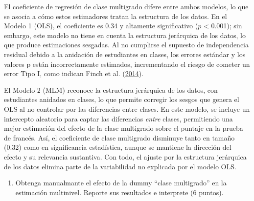 \documentclass[
  12pt,
  a4paper,
]{article}
\providecommand{\tightlist}{%
  \setlength{\itemsep}{0pt}\setlength{\parskip}{0pt}}
\begin{document}
El coeficiente de regresión de clase multigrado difere entre ambos modelos, lo que se asocia a cómo estos estimadores tratan la estructura de los datos. En el Modelo 1 (OLS), el coeficiente es 0.34 y altamente significativo (\(p\) \textless{} 0.001); sin embargo, este modelo no tiene en cuenta la estructura jerárquica de los datos, lo que produce estimaciones sesgadas. Al no cumplirse el supuesto de independencia residual debido a la anidación de estudiantes en clases, los errores estándar y los valores p están incorrectamente estimados, incrementando el riesgo de cometer un error Tipo I, como indican Finch et al. (\protect\hyperlink{ref-finch_multilevel_2014}{2014}).

El Modelo 2 (MLM) reconoce la estructura jerárquica de los datos, con estudiantes anidados en clases, lo que permite corregir los sesgos que genera el OLS al no controlar por las diferencias entre clases. En este modelo, se incluye un intercepto aleatorio para captar las diferencias \emph{entre} clases, permitiendo una mejor estimación del efecto de la clase multigrado sobre el puntaje en la prueba de francés. Así, el coeficiente de clase multigrado disminuye tanto en tamaño (0.32) como en significancia estadística, aunque se mantiene la dirección del efecto y su relevancia sustantiva. Con todo, el ajuste por la estructura jerárquica de los datos elimina parte de la variabilidad no explicada por el modelo OLS.

\begin{enumerate}
\def\labelenumi{\alph{enumi})}
\setcounter{enumi}{1}
\tightlist
\item
  Obtenga manualmante el efecto de la dummy ``clase multigrado'' en la estimación multinivel. Reporte sus resultados e interprete (6 puntos).
\end{enumerate}
\end{document}
